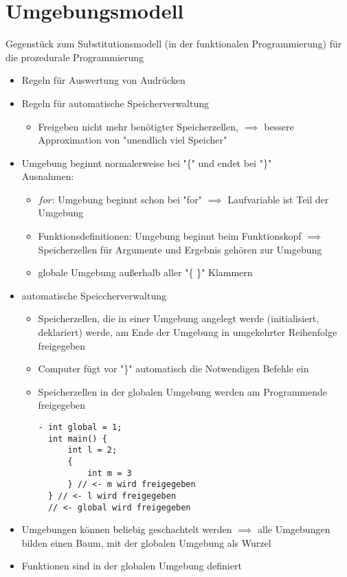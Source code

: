 \documentclass[a4paper]{scrartcl}
\theoremstyle{definition}
\theoremstyle{plain}
\theoremstyle{remark}
\theoremstyle{remark}
\begin{document}
\section{Umgebungsmodell}
\label{sec-9}
Gegenstück zum Substitutionsmodell (in der funktionalen Programmierung) für die prozedurale Programmierung
\begin{itemize}
\item Regeln für Auswertung von Audrücken
\item Regeln für automatische Speicherverwaltung
\begin{itemize}
\item Freigeben nicht mehr benötigter Speicherzellen, $\implies$ bessere Approximation von "unendlich viel Speicher"
\end{itemize}
\item Umgebung beginnt normalerweise bei "\{" und endet bei "\}" \\
    Ausnahmen:
\begin{itemize}
\item $for$: Umgebung beginnt schon bei "for" $\implies$ Laufvariable ist Teil der Umgebung
\item Funktionsdefinitionen: Umgebung beginnt beim Funktionskopf $\implies$ Speicherzellen für Argumente und Ergebnis gehören zur Umgebung
\item globale Umgebung außerhalb aller "\{ \}" Klammern
\end{itemize}
\item automatische Speiccherverwaltung
\begin{itemize}
\item Speicherzellen, die in einer Umgebung angelegt werde (initialisiert, deklariert) werde, am Ende der Umgebung in umgekehrter Reihenfolge freigegeben
\item Computer fügt vor "\}" automatisch die Notwendigen Befehle ein
\item Speicherzellen in der globalen Umgebung werden am Programmende freigegeben
\begin{verbatim}
- int global = 1;
  int main() {
	  int l = 2;
	  {
		  int m = 3
	  } // <- m wird freigegeben
  } // <- l wird freigegeben
  // <- global wird freigegeben
\end{verbatim}
\end{itemize}
\item Umgebungen können beliebig geschachtelt werden $\implies$ alle Umgebungen bilden einen Baum, mit der globalen Umgebung als Wurzel
\item Funktionen sind in der globalen Umgebung definiert

\end{itemize}
\end{document}
